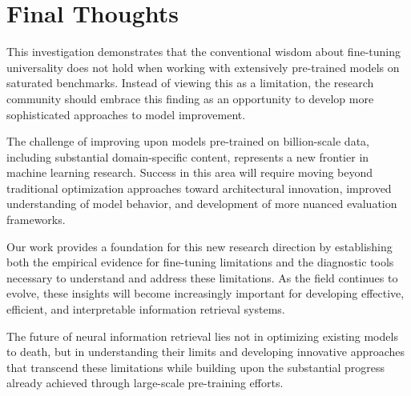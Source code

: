 \section{Final Thoughts}

This investigation demonstrates that the conventional wisdom about fine-tuning universality does not hold when working with extensively pre-trained models on saturated benchmarks. Instead of viewing this as a limitation, the research community should embrace this finding as an opportunity to develop more sophisticated approaches to model improvement.

The challenge of improving upon models pre-trained on billion-scale data, including substantial domain-specific content, represents a new frontier in machine learning research. Success in this area will require moving beyond traditional optimization approaches toward architectural innovation, improved understanding of model behavior, and development of more nuanced evaluation frameworks.

Our work provides a foundation for this new research direction by establishing both the empirical evidence for fine-tuning limitations and the diagnostic tools necessary to understand and address these limitations. As the field continues to evolve, these insights will become increasingly important for developing effective, efficient, and interpretable information retrieval systems.

The future of neural information retrieval lies not in optimizing existing models to death, but in understanding their limits and developing innovative approaches that transcend these limitations while building upon the substantial progress already achieved through large-scale pre-training efforts.


